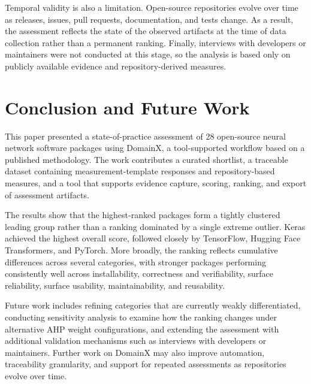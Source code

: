 \documentclass[final,1p,times,authoryear,12pt]{elsarticle}
\providecommand{\wss}[1]{\textcolor{blue}{\textit{#1}}}
\begin{document}
Temporal validity is also a limitation. Open-source
repositories evolve over time as releases, issues, pull
requests, documentation, and tests change. As a result, the
assessment reflects the state of the observed artifacts at
the time of data collection rather than a permanent ranking.
Finally, interviews with developers or maintainers were not
conducted at this stage, so the analysis is based only on
publicly available evidence and repository-derived measures.


\section{Conclusion and Future Work}\label{conclusion}
This paper presented a state-of-practice assessment of
28 open-source neural network software packages using
DomainX, a tool-supported workflow based on a published
methodology. The work contributes a curated shortlist, a
traceable dataset containing measurement-template responses
and repository-based measures, and a tool that supports
evidence capture, scoring, ranking, and export of
assessment artifacts.

The results show that the highest-ranked packages form a
tightly clustered leading group rather than a ranking
dominated by a single extreme outlier. Keras achieved the
highest overall score, followed closely by TensorFlow,
Hugging Face Transformers, and PyTorch. More broadly, the
ranking reflects cumulative differences across several
categories, with stronger packages performing consistently
well across installability, correctness and verifiability,
surface reliability, surface usability, maintainability,
and reusability.

Future work includes refining categories that are currently
weakly differentiated, conducting sensitivity analysis to
examine how the ranking changes under alternative AHP weight
configurations, and extending the assessment with additional
validation mechanisms such as interviews with developers or
maintainers. Further work on DomainX may also improve
automation, traceability granularity, and support for
repeated assessments as repositories evolve over time.
\end{document}
